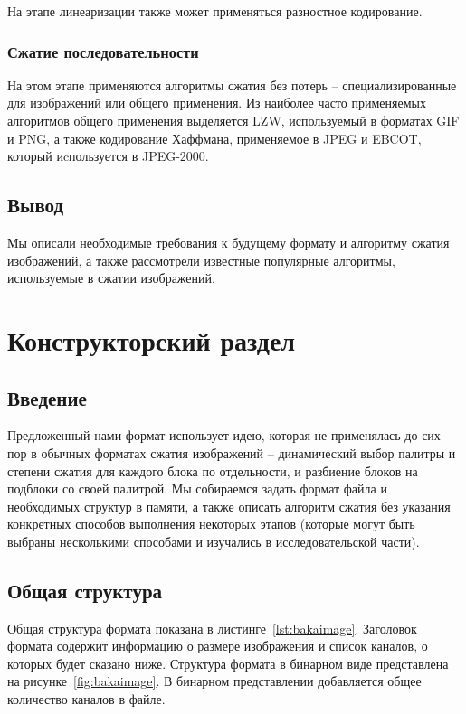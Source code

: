 \documentclass[a4paper,12pt]{article}
\numberwithin{equation}{section}
\begin{document}
На этапе линеаризации также может применяться разностное кодирование.

\subsubsection{Сжатие последовательности}

На этом этапе применяются алгоритмы сжатия без потерь -- специализированные для
изображений или общего применения. Из наиболее часто применяемых алгоритмов
общего применения выделяется LZW, используемый в форматах GIF и PNG, а также
кодирование Хаффмана, применяемое в JPEG и EBCOT, который иcпользуется в JPEG-2000.

\subsection{Вывод}

Мы описали необходимые требования к будущему формату и алгоритму сжатия
изображений, а также рассмотрели известные популярные алгоритмы, используемые в
сжатии изображений.

\section{Конструкторский раздел}

\subsection{Введение}

Предложенный нами формат использует идею, которая не применялась до сих пор в
обычных форматах сжатия изображений -- динамический выбор палитры и степени
сжатия для каждого блока по отдельности, и разбиение блоков на подблоки со своей
палитрой. Мы собираемся задать формат файла и необходимых структур в памяти, а
также описать алгоритм сжатия без указания конкретных способов выполнения
некоторых этапов (которые могут быть выбраны несколькими способами и изучались в
исследовательской части).

\subsection{Общая структура}

Общая структура формата показана в листинге~\ref{lst:bakaimage}. Заголовок
формата содержит информацию о размере изображения и список каналов, о которых
будет сказано ниже. Структура формата в бинарном виде представлена на
рисунке~\ref{fig:bakaimage}. В бинарном представлении добавляется общее
количество каналов в файле.
\end{document}
